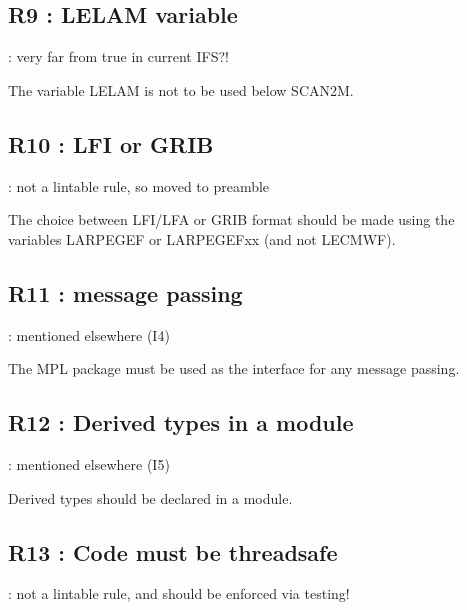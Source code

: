 \documentclass[letterpaper,10pt,english]{sphinxmanual}
\begin{document}
\sphinxstepscope


\subsection{R9 : LELAM variable}
\label{\detokenize{obsolescent/r9:r9-lelam-variable}}\label{\detokenize{obsolescent/r9::doc}}
\sphinxAtStartPar
{} : very far from true in current IFS?!

\sphinxAtStartPar
The variable LELAM is not to be used below SCAN2M.

\sphinxstepscope


\subsection{R10 :  LFI or GRIB}
\label{\detokenize{obsolescent/r10:r10-lfi-or-grib}}\label{\detokenize{obsolescent/r10::doc}}
\sphinxAtStartPar
{} : not a lintable rule, so moved to preamble

\sphinxAtStartPar
The  choice between  LFI/LFA  or  GRIB  format  should  be  made  using  the variables
LARPEGEF or LARPEGEF\sphinxhyphen{}xx (and not LECMWF).

\sphinxstepscope


\subsection{R11 :  message passing}
\label{\detokenize{obsolescent/r11:r11-message-passing}}\label{\detokenize{obsolescent/r11::doc}}
\sphinxAtStartPar
{} : mentioned elsewhere (I4)

\sphinxAtStartPar
The MPL package must be used as the interface for any message passing.

\sphinxstepscope


\subsection{R12 :  Derived types in a module}
\label{\detokenize{obsolescent/r12:r12-derived-types-in-a-module}}\label{\detokenize{obsolescent/r12::doc}}
\sphinxAtStartPar
{} : mentioned elsewhere (I5)

\sphinxAtStartPar
Derived types should be declared in a module.

\sphinxstepscope


\subsection{R13 :  Code must be threadsafe}
\label{\detokenize{obsolescent/r13:r13-code-must-be-threadsafe}}\label{\detokenize{obsolescent/r13::doc}}
\sphinxAtStartPar
{} : not a lintable rule, and should be enforced via testing!
\end{document}
